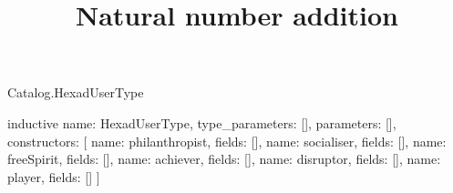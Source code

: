 \begin{lexlean}{Catalog.HexadUserType}
\title{Natural number addition}
\begin{semanticmodule}
inductive{
  name: HexadUserType,
  type_parameters: [],
  parameters: [],
  constructors: [
    {name: philanthropist, fields: []},
    {name: socialiser, fields: []},
    {name: freeSpirit, fields: []},
    {name: achiever, fields: []},
    {name: disruptor, fields: []},
    {name: player, fields: []}
  ]
}
\end{semanticmodule}
\end{lexlean}
